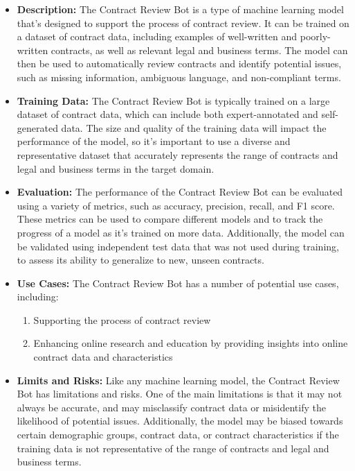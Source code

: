 \begin{itemize}
\begin{itemize}
    \item \textbf{Description:} The Contract Review Bot is a type of machine learning model that's designed to support the process of contract review. It can be trained on a dataset of contract data, including examples of well-written and poorly-written contracts, as well as relevant legal and business terms. The model can then be used to automatically review contracts and identify potential issues, such as missing information, ambiguous language, and non-compliant terms.
    \item \textbf{Training Data:} The Contract Review Bot is typically trained on a large dataset of contract data, which can include both expert-annotated and self-generated data. The size and quality of the training data will impact the performance of the model, so it's important to use a diverse and representative dataset that accurately represents the range of contracts and legal and business terms in the target domain.
    \item \textbf{Evaluation:} The performance of the Contract Review Bot can be evaluated using a variety of metrics, such as accuracy, precision, recall, and F1 score. These metrics can be used to compare different models and to track the progress of a model as it's trained on more data. Additionally, the model can be validated using independent test data that was not used during training, to assess its ability to generalize to new, unseen contracts.
    \item \textbf{Use Cases:} The Contract Review Bot has a number of potential use cases, including:
        \begin{enumerate}  
            \item Supporting the process of contract review
            \item Enhancing online research and education by providing insights into online contract data and characteristics
        \end{enumerate}
    \item \textbf{Limits and Risks:} Like any machine learning model, the Contract Review Bot has limitations and risks. One of the main limitations is that it may not always be accurate, and may misclassify contract data or misidentify the likelihood of potential issues. Additionally, the model may be biased towards certain demographic groups, contract data, or contract characteristics if the training data is not representative of the range of contracts and legal and business terms.

\end{itemize}
\end{itemize}
